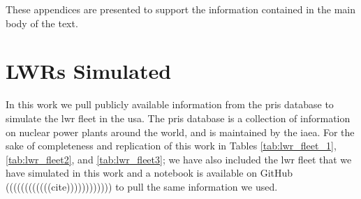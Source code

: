 These appendices are presented to support the information contained in the main body of the text.

\section{LWRs Simulated}
\label{app:lwrs}

In this work we pull publicly available information from the \gls{pris} database to simulate the \gls{lwr} fleet in the \gls{usa}. The \gls{pris} database is a collection of information on nuclear power plants around the world, and is maintained by the \gls{iaea}. For the sake of completeness and replication of this work in Tables \ref{tab:lwr_fleet_1}, \ref{tab:lwr_fleet2}, and \ref{tab:lwr_fleet3}; we have also included the \gls{lwr} fleet that we have simulated in this work and a notebook is available on GitHub ((((((((((((cite)))))))))))) to pull the same information we used.


